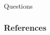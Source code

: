 \documentclass{beamer}
\begin{document}
	\begin{frame}
		Questions
	\end{frame}
	
	
	\begin{frame}
		\frametitle{References}
		\tiny
		
		
	\end{frame}
\end{document}
